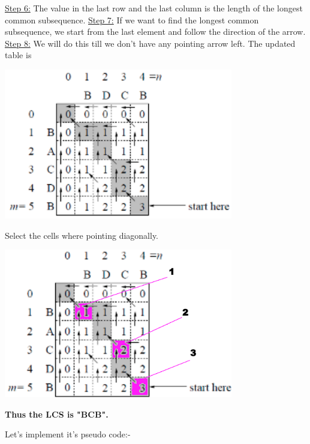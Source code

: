 \documentclass[12pt]{book}
\begin{document}
\underline{Step 6:} The value in the last row and the last column is the length of the longest common subsequence.\newline\newline
\underline{Step 7:} If we want to find the longest common subsequence, we start from the last element and follow the direction of the arrow.\newline\newline
\underline{Step 8:} We will do this till we don’t have any pointing arrow left.\newline\newline
The updated table is\newline\newline
\begin{center}
    \includegraphics[width =10cm]{LCS-2.png}    
\end{center}
Select the cells where pointing diagonally.\newline\newline
\begin{center}
    \includegraphics[width =10cm]{LCS-3.png}    
\end{center}
\textbf{Thus the LCS is "BCB".}\newline

Let’s implement it’s pseudo code:-
\end{document}
